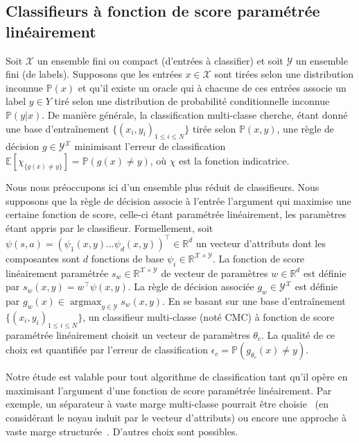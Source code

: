 \documentclass[french,utf8]{./hermes-journal}
\newcommand{\argmax}{\operatorname*{argmax}} %
\newcommand{\X}{\mathcal{X}}
\newcommand{\Y}{\mathcal{Y}}
\newcommand{\E}{\mathbb{E}}
\newcommand{\prob}{\mathbb{P}}
\begin{document}
\subsection{Classifieurs à fonction de score paramétrée linéairement} \label{subseackgrounlassif}

Soit $\X$ un ensemble fini ou compact (d'entrées à classifier)
 et soit $\Y$ un ensemble fini (de labels). Supposons que les entrées $x\in
\X$ sont tirées selon une distribution inconnue $\prob(x)$ et qu'il existe un oracle qui à chacune de ces entrées associe un label $y\in Y$ tiré selon une distribution de probabilité conditionnelle inconnue $\prob(y|x)$. De manière générale, la classification multi-classe cherche, étant donné une base d'entraînement $\{(x_i,y_i)_{1\leq i \leq N}\}$ tirée selon $\prob(x,y)$, une règle de décision $g\in\Y^\X$ minimisant l'erreur de classification $\E[\chi_{\{g(x)\neq y\}}] = \prob(g(x)\neq y)$, où $\chi$ est la fonction indicatrice.

Nous nous préoccupons ici d'un ensemble plus réduit de classifieurs. Nous supposons que la règle de décision associe à l'entrée l'argument qui maximise une certaine fonction de score, celle-ci étant paramétrée linéairement, les paramètres étant appris par le classifieur. Formellement, soit $\psi(s,a) =
(\psi_1(x,y)  \dots  \psi_d(x,y))^\top\in \mathbb{R}^d$
un vecteur d'attributs dont les composantes sont $d$ fonctions de base $\psi_i\in\mathbb{R}^{\X\times\Y}$. La fonction de score linéairement paramétrée $s_w\in\mathbb{R}^{\X\times \Y}$ de vecteur de paramètres $w\in\mathbb{R}^d$ est définie par $s_w(x,y) = w^\top \psi(x,y)$. La règle de décision associée $g_w\in{\Y^\X}$ est définie par $g_w(x) \in \argmax_{y\in\Y}s_w(x,y)$. En se basant sur une base d'entraînement $\{(x_i,y_i)_{1\leq
i\leq N}\}$, un classifieur multi-classe (noté CMC) à fonction de score paramétrée linéairement choisit un vecteur de paramètres $\theta_c$. La qualité de ce choix est quantifiée par l'erreur de classification $\epsilon_c =
\prob(g_{\theta_c}(x)\neq y)$. %

Notre étude est valable pour tout algorithme de classification tant qu'il opère en maximisant l'argument d'une fonction de score paramétrée linéairement. Par exemple, un séparateur à vaste marge multi-classe pourrait être choisie~\cite{Guermeu007} (en considérant le noyau induit par le vecteur d'attributs) ou encore une approche à vaste marge structurée~\cite{Taska005}. D'autres choix sont possibles.
\end{document}
